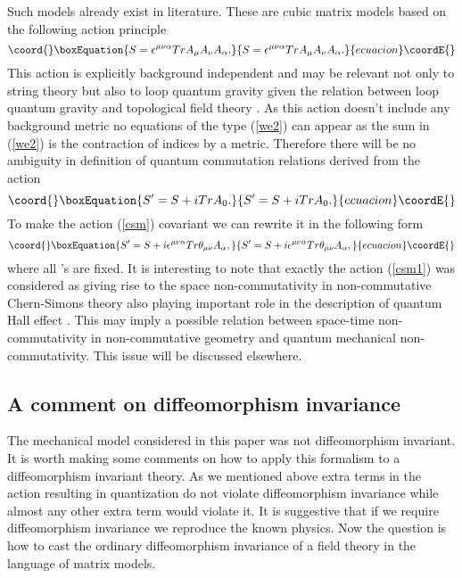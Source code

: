 \documentclass[a4paper,11pt]{article}
\begin{document}
Such models already exist in literature. These are cubic matrix
models \cite{cmm} based on the following action principle
\begin{equation}\coord{}\boxEquation{
S=\epsilon^{\mu \nu \alpha} Tr A_\mu A_\nu A_\alpha.
}{
S=\epsilon^{\mu \nu \alpha} Tr A_\mu A_\nu A_\alpha.
}{ecuacion}\coordE{}\end{equation}
This action is explicitly background independent and may be
relevant not only to string theory but also to loop quantum
gravity given the relation between loop quantum gravity and
topological field theory \cite{llt}. As this action doesn't
include any background metric no equations of the type (\ref{we2})
can appear as the sum in (\ref{we2}) is the contraction of indices
by a metric. Therefore there will be no ambiguity in definition of
quantum commutation relations derived from the action
\begin{equation}\coord{}\boxEquation{
S'=S+iTrA_0. \label{csm}
}{
S'=S+iTrA_0. }{ecuacion}\coordE{}\end{equation}
To make the action (\ref{csm}) covariant we can rewrite it in the
following form
\begin{equation}\coord{}\boxEquation{
S'=S+i\epsilon^{\mu \nu \alpha}Tr\theta_{\mu \nu}A_\alpha,
\label{csm1}
}{
S'=S+i\epsilon^{\mu \nu \alpha}Tr\theta_{\mu \nu}A_\alpha,
}{ecuacion}\coordE{}\end{equation}
where all \myHighlight{$\theta$}\coordHE{}'s are fixed. It is interesting to note that
exactly the action (\ref{csm1}) was considered as giving rise to
the space non-commutativity in non-commutative Chern-Simons theory
also playing important role in the description of quantum Hall
effect \cite{noncomcs}. This may imply a possible relation between
space-time non-commutativity in non-commutative geometry and
quantum mechanical non-commutativity. This issue will be discussed
elsewhere.


\subsection*{A comment on diffeomorphism invariance}
The mechanical model considered in this paper was not
diffeomorphism invariant. It is worth making some comments on how
to apply this formalism to a diffeomorphism invariant theory. As
we mentioned above extra terms in the action resulting in
quantization do not violate diffeomorphism invariance while almost
any other extra term would violate it. It is suggestive that if we
require diffeomorphism invariance we reproduce the known physics.
Now the question is how to cast the ordinary diffeomorphism
invariance of a field theory in the language of matrix models.
\end{document}

